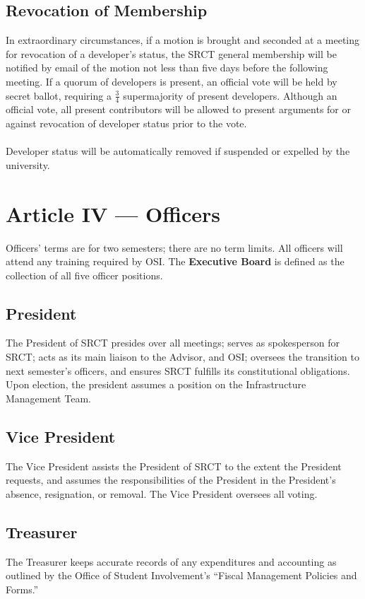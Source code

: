 \documentclass{article}
\begin{document}
  \subsection{Revocation of Membership}
  In extraordinary circumstances, if a motion is brought and seconded at 
  a meeting for revocation of a developer's status, the SRCT general membership
  will be notified by email of the motion not less than five days before the
  following meeting. If a quorum of developers is present, an official vote 
  will be held by secret ballot, requiring a $\frac{3}{4}$ supermajority of 
  present developers. Although an official vote, all present contributors will
  be allowed to present arguments for or against revocation of developer
  status prior to the vote. 
  \\ \\
  Developer status will be automatically removed if suspended or expelled by 
  the university.
  
  \section{Article IV --- Officers}
  Officers' terms are for two semesters; there are no term limits. All 
  officers will attend any training required by OSI. The 
  \textbf{Executive Board} is defined as the collection of all five
  officer positions.
  
  \subsection{President}
  The President of SRCT presides over all meetings; serves as 
  spokesperson for SRCT; acts as its main liaison to the Advisor, 
  and OSI; oversees the transition to next semester's officers, and 
  ensures SRCT fulfills its constitutional obligations. Upon election,
  the president assumes a position on the Infrastructure Management Team.
  
  \subsection{Vice President}
  The Vice President assists the President of SRCT to the extent the 
  President requests, and assumes the responsibilities of the President 
  in the President's absence, resignation, or removal. The Vice 
  President oversees all voting.
  
  \subsection{Treasurer}
  The Treasurer keeps accurate records of any expenditures and 
  accounting as outlined by the Office of Student Involvement's 
  ``Fiscal Management Policies and Forms.''
  
\end{document}
